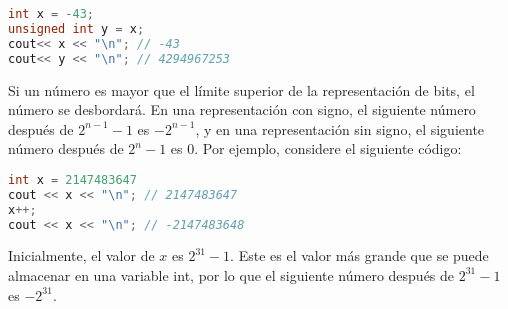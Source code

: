 \begin{lstlisting}[language=C++]
int x = -43;
unsigned int y = x;
cout<< x << "\n"; // -43
cout<< y << "\n"; // 4294967253
\end{lstlisting}

Si un número es mayor que el límite superior de la representación de bits, el número se desbordará. En una representación con signo, el siguiente número después de $2^{n-1}-1$ es $-2^{n-1}$, y en una representación sin signo, el siguiente número después de $2^n-1$ es $0$. Por ejemplo, considere el siguiente código:

\begin{lstlisting}[language=C++]
int x = 2147483647
cout << x << "\n"; // 2147483647
x++;
cout << x << "\n"; // -2147483648
\end{lstlisting}

Inicialmente, el valor de $x$ es $2^{31}-1$. Este es el valor más grande que se puede almacenar en una variable int, por lo que el siguiente número después de $2^{31}-1$ es $-2^{31}$.